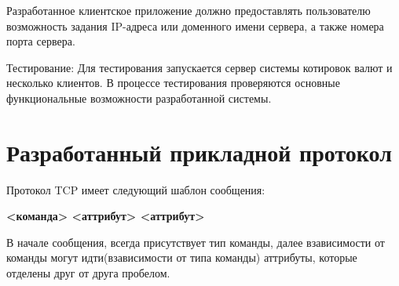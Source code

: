 \documentclass[a4paper,14pt]{article}
\begin{document}
Разработанное клиентское приложение должно предоставлять пользователю возможность задания IP-адреса или доменного имени сервера, а также номера порта сервера.

Тестирование:
Для тестирования запускается сервер системы котировок валют и несколько клиентов. В процессе тестирования проверяются основные функциональные возможности разработанной системы.
\section{Разработанный прикладной протокол}
Протокол TCP имеет следующий шаблон сообщения:
\begin{center}
	\textbf{<команда> <аттрибут> <аттрибут>}
\end{center}
В начале сообщения, всегда присутствует тип команды, далее взависимости от команды могут идти(взависимости от типа команды) аттрибуты, которые отделены друг от друга пробелом.
\end{document}
